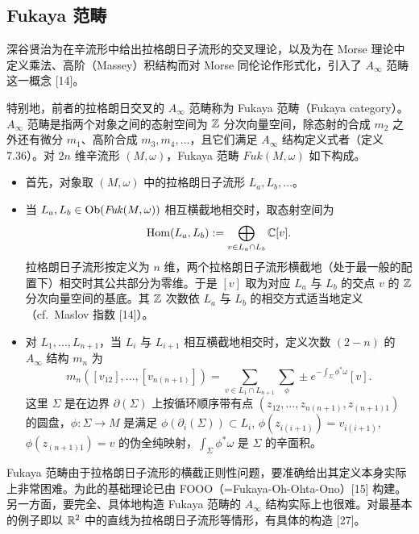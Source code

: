 \subsection{Fukaya 范畴}

深谷贤治为在辛流形中给出拉格朗日子流形的交叉理论，以及为在 Morse 理论中定义乘法、高阶（Massey）积结构而对 Morse 同伦论作形式化，引入了 $A_\infty$ 范畴这一概念 [14]。

特别地，前者的拉格朗日交叉的 $A_\infty$ 范畴称为 Fukaya 范畴（Fukaya category）。$A_\infty$ 范畴是指两个对象之间的态射空间为 $\mathbb{Z}$ 分次向量空间，除态射的合成 $m_2$ 之外还有微分 $m_1$、高阶合成 $m_3,m_4,\ldots$，且它们满足 $A_\infty$ 结构定义式者（定义 7.36）。对 $2n$ 维辛流形 $(M,\omega)$，Fukaya 范畴 $\mathit{Fuk}(M,\omega)$ 如下构成。

\begin{itemize}
\item 首先，对象取 $(M,\omega)$ 中的拉格朗日子流形 $L_a,L_b,\ldots$。
\item 当 $L_a,L_b\in\operatorname{Ob}(\mathit{Fuk}(M,\omega))$ 相互横截地相交时，取态射空间为
\[\operatorname{Hom}(L_a,L_b):=\bigoplus_{v\in L_a\cap L_b}\mathbb{C}[v].\]
拉格朗日子流形按定义为 $n$ 维，两个拉格朗日子流形横截地（处于最一般的配置下）相交时其公共部分为零维。于是 $[v]$ 取为对应 $L_a$ 与 $L_b$ 的交点 $v$ 的 $\mathbb{Z}$ 分次向量空间的基底。其 $\mathbb{Z}$ 次数依 $L_a$ 与 $L_b$ 的相交方式适当地定义（cf.\ Maslov 指数 [14]）。
\item 对 $L_1,\ldots,L_{n+1}$，当 $L_i$ 与 $L_{i+1}$ 相互横截地相交时，定义次数 $(2-n)$ 的 $A_\infty$ 结构 $m_n$ 为
\[m_n([v_{12}],\ldots,[v_{n(n+1)}])=\sum_{v\in L_1\cap L_{n+1}}\sum_{\phi}\pm e^{-\int_{\Sigma}\phi^{*}\omega}[v].\]
这里 $\Sigma$ 是在边界 $\partial(\Sigma)$ 上按循环顺序带有点 $(z_{12},\ldots,z_{n(n+1)},z_{(n+1)1})$ 的圆盘，$\phi : \Sigma\to M$ 是满足 $\phi(\partial_i(\Sigma))\subset L_i$, $\phi(z_{i(i+1)})=v_{i(i+1)}$, $\phi(z_{(n+1)1})=v$ 的伪全纯映射，$\int_{\Sigma}\phi^{*}\omega$ 是 $\Sigma$ 的辛面积。
\end{itemize}

Fukaya 范畴由于拉格朗日子流形的横截正则性问题，要准确给出其定义本身实际上非常困难。为此的基础理论已由 FOOO（=Fukaya-Oh-Ohta-Ono）[15] 构建。另一方面，要完全、具体地构造 Fukaya 范畴的 $A_\infty$ 结构实际上也很难。对最基本的例子即以 $\mathbb{R}^2$ 中的直线为拉格朗日子流形等情形，有具体的构造 [27]。


